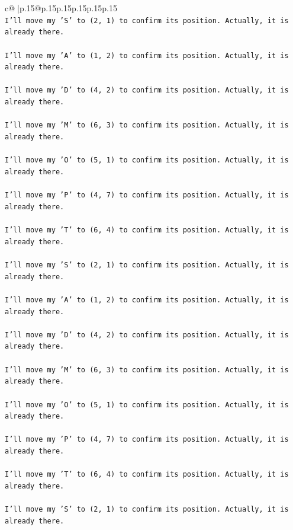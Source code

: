 \documentclass{article}
\begin{document}
{\begin{supertabular}{c@{$\;$}|p{.15\linewidth}@{}p{.15\linewidth}p{.15\linewidth}p{.15\linewidth}p{.15\linewidth}p{.15\linewidth}}
{{{\\ 
\texttt{I'll move my 'S' to (2, 1) to confirm its position. Actually, it is already there.} \\
\\ 
\texttt{I'll move my 'A' to (1, 2) to confirm its position. Actually, it is already there.} \\
\\ 
\texttt{I'll move my 'D' to (4, 2) to confirm its position. Actually, it is already there.} \\
\\ 
\texttt{I'll move my 'M' to (6, 3) to confirm its position. Actually, it is already there.} \\
\\ 
\texttt{I'll move my 'O' to (5, 1) to confirm its position. Actually, it is already there.} \\
\\ 
\texttt{I'll move my 'P' to (4, 7) to confirm its position. Actually, it is already there.} \\
\\ 
\texttt{I'll move my 'T' to (6, 4) to confirm its position. Actually, it is already there.} \\
\\ 
\texttt{I'll move my 'S' to (2, 1) to confirm its position. Actually, it is already there.} \\
\\ 
\texttt{I'll move my 'A' to (1, 2) to confirm its position. Actually, it is already there.} \\
\\ 
\texttt{I'll move my 'D' to (4, 2) to confirm its position. Actually, it is already there.} \\
\\ 
\texttt{I'll move my 'M' to (6, 3) to confirm its position. Actually, it is already there.} \\
\\ 
\texttt{I'll move my 'O' to (5, 1) to confirm its position. Actually, it is already there.} \\
\\ 
\texttt{I'll move my 'P' to (4, 7) to confirm its position. Actually, it is already there.} \\
\\ 
\texttt{I'll move my 'T' to (6, 4) to confirm its position. Actually, it is already there.} \\
\\ 
\texttt{I'll move my 'S' to (2, 1) to confirm its position. Actually, it is already there.} \\
}}}
\end{supertabular}}
\end{document}
